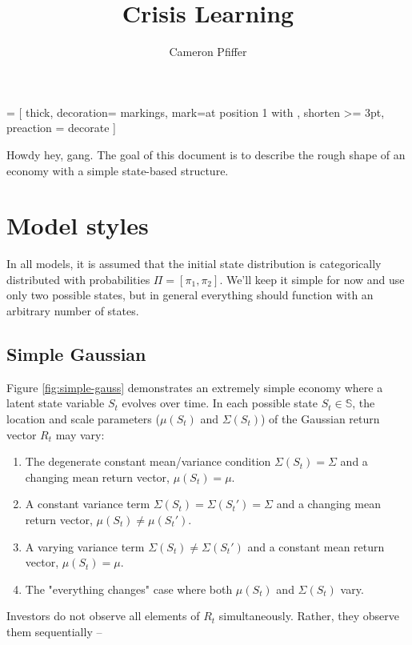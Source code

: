 \documentclass{article}
\title{Crisis Learning}
\author{Cameron Pfiffer}
\begin{document}
 = [
	thick, 
	decoration={
		markings,
		mark=at position 1 with {
			}
		}, 
	shorten >= 3pt, preaction = {decorate}
	]

\maketitle

Howdy hey, gang. The goal of this document is to describe the rough shape of an economy with a simple state-based structure. 

\section{Model styles}

In all models, it is assumed that the initial state distribution is categorically distributed with probabilities $\Pi = [\pi_1, \pi_2]$. We'll keep it simple for now and use only two possible states, but in general everything should function with an arbitrary number of states. 

\subsection{Simple Gaussian}

Figure \ref{fig:simple-gauss} demonstrates an extremely simple economy where a latent state variable $S_t$ evolves over time. In each possible state $S_t \in \mathbb{S}$, the location and scale parameters ($\mu(S_t)$ and $\Sigma(S_t)$) of the Gaussian return vector $R_t$ may vary:

\begin{enumerate}
    \item The degenerate constant mean/variance condition
    $\Sigma(S_t)= \Sigma$ and a changing mean return vector, $\mu(S_t) = \mu$.
    \item A constant variance term $\Sigma(S_t) = \Sigma(S_t') = \Sigma$ and a changing mean return vector, $\mu(S_t) \ne \mu(S_t')$.
    \item A varying variance term $\Sigma(S_t) \ne \Sigma(S_t')$ and a constant mean return vector, $\mu(S_t) = \mu$.
    \item The "everything changes" case where both $\mu(S_t)$ and $\Sigma(S_t)$ vary.
\end{enumerate}

Investors do not observe all elements of $R_t$ simultaneously. Rather, they observe them sequentially -- 
\end{document}
